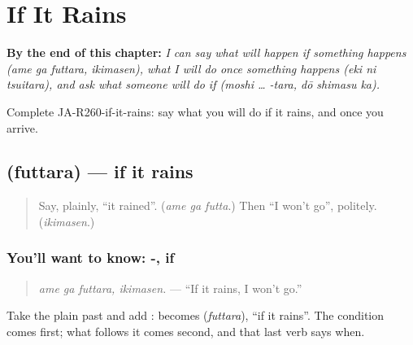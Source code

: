 
\chapter{If It Rains}
\label{ch:ja-if-it-rains}

\begin{chapteropening}
\textbf{By the end of this chapter:} \emph{I can say what will happen if something happens (ame ga futtara, ikimasen), what I will do once something happens (eki ni tsuitara), and ask what someone will do if (moshi … -tara, dō shimasu ka).}

Complete JA-R260-if-it-rains: say what you will do if it rains, and once you arrive.
\end{chapteropening}

\section[\texorpdfstring{\ja{ふったら} (futtara)}{ふったら (futtara)}]{ (futtara) — if it rains}

\label{lesson:JA-C260-futtara}



\begin{quote}
Say, plainly, \textquotedblleft{}it rained\textquotedblright{}. (\emph{ame ga futta}.) Then \textquotedblleft{}I won't go\textquotedblright{}, politely. (\emph{ikimasen}.)
\end{quote}

\subsection*{You'll want to know: -, if}
\begin{quote}
\textbf{ }
\end{quote}

\begin{quote}
\emph{ame ga futtara, ikimasen.} — \textquotedblleft{}If it rains, I won't go.\textquotedblright{}
\end{quote}

Take the plain past and add \textbf{}: \textbf{} becomes \textbf{} (\emph{futtara}), \textquotedblleft{}if it rains\textquotedblright{}. The condition comes first; what follows it comes second, and that last verb says when.

